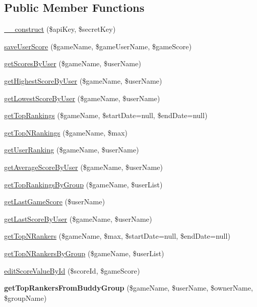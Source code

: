 \subsection*{Public Member Functions}
\begin{DoxyCompactItemize}
\item 
\hyperlink{class_score_board_service_a49f2ad222e06420736d750e167d55d7c}{\+\_\+\+\_\+construct} (\$api\+Key, \$secret\+Key)
\item 
\hyperlink{class_score_board_service_a7a085f59ec23e4043f61e14c0649c1b3}{save\+User\+Score} (\$game\+Name, \$game\+User\+Name, \$game\+Score)
\item 
\hyperlink{class_score_board_service_a0cd4f45da55f6ff70c687c1c71511387}{get\+Scores\+By\+User} (\$game\+Name, \$user\+Name)
\item 
\hyperlink{class_score_board_service_a6e66d1ab5efddab46c2c8b1320851fce}{get\+Highest\+Score\+By\+User} (\$game\+Name, \$user\+Name)
\item 
\hyperlink{class_score_board_service_a7d54be07a48a65d2d8fd5bc7e856cec4}{get\+Lowest\+Score\+By\+User} (\$game\+Name, \$user\+Name)
\item 
\hyperlink{class_score_board_service_a333c548c3731be4928bcce9919d5ef70}{get\+Top\+Rankings} (\$game\+Name, \$start\+Date=null, \$end\+Date=null)
\item 
\hyperlink{class_score_board_service_ae48afebf03f1e83ff8c07ce821d3f48a}{get\+Top\+N\+Rankings} (\$game\+Name, \$max)
\item 
\hyperlink{class_score_board_service_a4e12db96d04e039467bbbf3d38b3bc27}{get\+User\+Ranking} (\$game\+Name, \$user\+Name)
\item 
\hyperlink{class_score_board_service_a8c94ddec49518fc3deeb6d1bb2a7c150}{get\+Average\+Score\+By\+User} (\$game\+Name, \$user\+Name)
\item 
\hyperlink{class_score_board_service_ae7cd992c2639e5fd743527464688e86e}{get\+Top\+Rankings\+By\+Group} (\$game\+Name, \$user\+List)
\item 
\hyperlink{class_score_board_service_a444cd229dcde91f2f4c8955bd749e999}{get\+Last\+Game\+Score} (\$user\+Name)
\item 
\hyperlink{class_score_board_service_ac3df851d8083e5d023808356d6029d63}{get\+Last\+Score\+By\+User} (\$game\+Name, \$user\+Name)
\item 
\hyperlink{class_score_board_service_a6b8d0798d02130ed85c1d41363421751}{get\+Top\+N\+Rankers} (\$game\+Name, \$max, \$start\+Date=null, \$end\+Date=null)
\item 
\hyperlink{class_score_board_service_a06c1ef766638a16806f3d949f38ed91e}{get\+Top\+N\+Rankers\+By\+Group} (\$game\+Name, \$user\+List)
\item 
\hyperlink{class_score_board_service_a21e671fb8da8d2bbb798434ab7056b05}{edit\+Score\+Value\+By\+Id} (\$score\+Id, \$game\+Score)
\item 
\hypertarget{class_score_board_service_ad8bb6b840941d069c599348128cbfc32}{{\bfseries get\+Top\+Rankers\+From\+Buddy\+Group} (\$game\+Name, \$user\+Name, \$owner\+Name, \$group\+Name)}\label{class_score_board_service_ad8bb6b840941d069c599348128cbfc32}


\end{DoxyCompactItemize}

